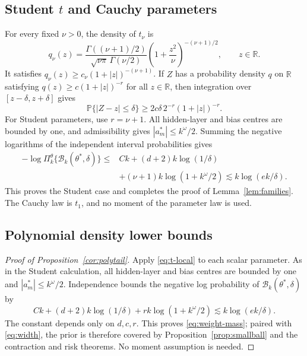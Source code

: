 \documentclass[11pt,a4paper]{article}
\theoremstyle{remark}
\newcommand{\PP}{\mathbb P}
\begin{document}
\subsection{Student \texorpdfstring{$t$}{t} and Cauchy parameters}

For every fixed $\nu>0$, the density of $t_\nu$ is
\[
q_\nu(z)=\frac{\Gamma((\nu+1)/2)}
{\sqrt{\nu\pi}\,\Gamma(\nu/2)}
\left(1+\frac{z^2}{\nu}\right)^{-(\nu+1)/2},
\qquad z\in\mathbb R.
\]
It satisfies $q_\nu(z)\geq c_\nu(1+|z|)^{-(\nu+1)}$.
If $Z$ has a probability density $q$ on $\mathbb R$ satisfying
$q(z)\geq c(1+|z|)^{-r}$ for all $z\in\mathbb R$, then
integration over $[z-\delta,z+\delta]$ gives
\begin{equation}\label{eq:t-local}
\PP\{|Z-z|\leq\delta\}
\geq2c\delta\,2^{-r}(1+|z|)^{-r}.
\end{equation}
For Student parameters, use $r=\nu+1$.
All hidden-layer and bias centres are bounded by one, and
admissibility gives $|a_m^*|\leq k^\omega/2$. Summing the
negative logarithms of the independent interval probabilities gives
\begin{equation}\label{eq:t-box-full}
\begin{split}
-\log\Pi_k^\theta\{\mathcal B_k(\theta^*,\delta)\}
\leq{}&Ck+(d+2)k\log(1/\delta)\\
&+(\nu+1)k\log(1+k^\omega/2)
\lesssim k\log(ek/\delta).
\end{split}
\end{equation}
This proves the Student case and completes the proof of
Lemma~\ref{lem:families}. The Cauchy law is $t_1$, and no moment
of the parameter law is used.

\subsection{Polynomial density lower bounds}
\label{app:polynomial-density}

\begin{proof}[Proof of Proposition~\ref{cor:polytail}]
Apply \eqref{eq:t-local} to each scalar parameter. As in the
Student calculation, all hidden-layer and bias centres are bounded
by one and $|a_m^*|\leq k^\omega/2$.
Independence bounds the negative log probability of
$\mathcal B_k(\theta^*,\delta)$ by
\[
Ck+(d+2)k\log(1/\delta)+rk\log(1+k^\omega/2)
\lesssim k\log(ek/\delta).
\]
The constant depends only on $d,c,r$. This proves
\eqref{eq:weight-mass}; paired with \eqref{eq:width}, the prior is
therefore covered by Proposition~\ref{prop:smallball} and the
contraction and risk theorems. No moment assumption is needed.
\end{proof}
\end{document}

